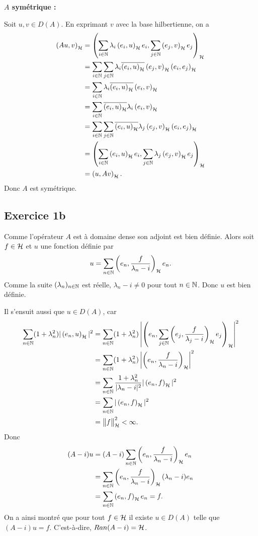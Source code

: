 \textbf{$A$ symétrique :}


Soit $u, v \in D(A)$. En exprimant $v$ avec la base
hilbertienne, on a
\begin{align}
    \psh{Au}{v} &= \psh{\sum_\inn{i} \lambda_i \psh{e_i}{u} e_i}
    {\sum_\inn{j} \psh{e_j}{v} e_j} \\
    &= \sum_\inn{i} \sum_\inn{j} \lambda_i
    \overline{\psh{e_i}{u}} \psh{e_j}{v} \psh{e_i}{e_j} \\
    &= \sum_\inn{i} \lambda_i \overline{\psh{e_i}{u}} \psh{e_i}{v} \\
    &= \sum_\inn{i} \overline{\psh{e_i}{u}} \lambda_i \psh{e_i}{v} \\
%
    &= \sum_\inn{i} \sum_\inn{j}
    \overline{\psh{e_i}{u}} \lambda_j \psh{e_j}{v} \psh{e_i}{e_j} \\
%
    &= \psh{\sum_\inn{i} \psh{e_i}{u} e_i}
    {\sum_\inn{j} \lambda_j \psh{e_j}{v} e_j} \\
    &= \psh{u}{Av}.
\end{align}
%
Donc $A$ est symétrique.


\subsection*{Exercice 1b}

Comme l'opérateur $A$ est à domaine dense son adjoint
est bien définie. Alors soit $f \in \mathcal{H}$ et $u$ une fonction définie par
\begin{align}
    u = \sum_{{n \in \mathbb{N}}} \left( e_n, \frac{f}{\lambda_n - i} \right)_{\mathcal{H}} e_n.
\end{align}
%
Comme la suite $({\lambda}_n)_{n \in \mathbb{N}}$ est réelle,
$\lambda_n - i \neq 0$ pour tout ${n \in \mathbb{N}}$. Donc $u$ est
bien définie.

Il s'ensuit aussi que $u \in D(A)$, car
\begin{align}
    \sum_{n \in \mathbb{N}} (1 + \lambda_n^2) |\left( e_n, u \right)_{\mathcal{H}}|^2
    &= \sum_{n \in \mathbb{N}} (1 + \lambda_n^2) \left| \left( e_n, \sum_{{j \in \mathbb{N}}} \left( e_j, \frac{f}{\lambda_j - i} \right)_{\mathcal{H}} e_j \right)_{\mathcal{H}} \right|^2 \\
    &= \sum_{n \in \mathbb{N}} (1 + \lambda_n^2)
    \left| \left( e_n, \frac{f}{\lambda_n - i} \right)_{\mathcal{H}} \right|^2 \\
    &= \sum_{n \in \mathbb{N}} \frac{1 + \lambda_n^2}{|\lambda_n - i|^2}
    | \left( e_n, f \right)_{\mathcal{H}}|^2 \\
    &= \sum_{n \in \mathbb{N}} |\left( e_n, f \right)_{\mathcal{H}}|^2 \\
    &= \big\| f \big\|_{\mathcal{H}}^2 < \infty.
\end{align}
%
Donc
\begin{align}
    (A - i)u
    &= (A - i)\sum_{{n \in \mathbb{N}}} \left( e_n, \frac{f}{\lambda_n - i} \right)_{\mathcal{H}} e_n \\
    &= \sum_{{n \in \mathbb{N}}} \left( e_n, \frac{f}{\lambda_n - i} \right)_{\mathcal{H}}(\lambda_n - i)e_n \\
    &= \sum_{{n \in \mathbb{N}}} \left( e_n, f \right)_{\mathcal{H}} e_n = f.
\end{align}
%
On a ainsi montré que pour tout $f \in \mathcal{H}$
il existe $u \in D(A)$ telle que $(A - i)u = f$.
C'est-à-dire, $Ran(A - i) = \mathcal{H}$.


